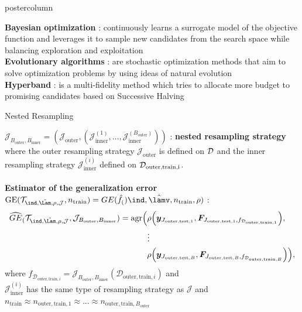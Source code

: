 \documentclass{beamer}
\begin{document}
\begin{frame}[fragile]{}
\begin{columns}
\begin{column}{.31\textwidth}
\begin{beamercolorbox}[center]{postercolumn}
\begin{minipage}{.98\textwidth}
{\textbf{Bayesian optimization} : continuously learns a surrogate model of the objective function and leverages it to sample new candidates from the search space while balancing exploration and exploitation\\

\textbf{Evolutionary algorithms} : are stochastic optimization methods that aim to solve optimization problems by using ideas of natural evolution\\

\textbf{Hyperband} : is a multi-fidelity method which tries to allocate more budget to promising candidates based on Successive Halving \\

\begin{myblock}{Nested Resampling}

$\mathcal{J}_{B_\mathrm{outer},B_\mathrm{inner}} = \left(\mathcal{J}_{\mathrm{outer}}, \left(\mathcal{J}_{\mathrm{inner}}^{(1)},\dots,\mathcal{J}_{\mathrm{inner}}^{(B_\mathrm{outer})}
\right)\right)$ : \textbf{nested resampling strategy} where the outer resampling strategy  $\mathcal{J}_{\mathrm{outer}}$ is defined on $\mathcal{D}$ and the inner resampling strategy $\mathcal{J}_{\mathrm{inner}}^{(i)}$ defined on $\mathcal{D}_{\textrm{outer,train,i}}$. \\\\
\textbf{Estimator of the generalization error} $\mathrm{GE}(\mathcal{T}_{\ind, \LamS, \rho, \mathcal{J}}, n_\mathrm{train}) = \GE(\ind, \lamh, n_\mathrm{train}, \rho)$ :
\begin{equation*}
\begin{split}
\GEh(\mathcal{T}_{\ind, \LamS, \rho, \mathcal{J}}, \mathcal{J}_{B_\mathrm{outer},B_\mathrm{inner}}) = \mathrm{agr}\Big(
 &\rho\Big(\boldsymbol{y}_{J_{\mathrm{outer,test},1}}, \boldsymbol{F}_{J_{\mathrm{outer,test},1},f_{\mathcal{D}_{\mathrm{outer,train},1}}}\Big), \\ &\large{\vdots} \\
& \rho\Big(\boldsymbol{y}_{J_{\mathrm{outer,test},B}}, \boldsymbol{F}_{J_{\mathrm{outer,test},B},
f_{\mathcal{D}_{\mathrm{outer,train},B}}}\Big)
    \Big),
\end{split}
\end{equation*}
where $f_{\mathcal{D}_{\mathrm{outer,train},i}} = \mathcal{J}_{B_\mathrm{outer},B_\mathrm{inner}}(\mathcal{D}_{\mathrm{outer,train},i})$ and \\
$\mathcal{J}_{\mathrm{inner}}^{(i)}$ has the same type of resampling strategy as $\mathcal{J}$ and \\
$n_{\mathrm{train}} \approx n_{\mathrm{outer,train},1} \approx \dots \approx n_{\mathrm{outer,train},B_\mathrm{outer}}$


\end{myblock}}
\end{minipage}
\end{beamercolorbox}
\end{column}
\end{columns}
\end{frame}
\end{document}
